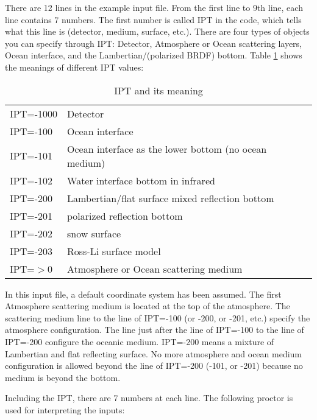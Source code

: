 \documentclass[10pt,letterpaper]{article}
\begin{document}
There are 12 lines in the example input file.  From the first line to 9th line, each line contains 7 numbers.  The first number is called IPT in the code, which tells what this line is (detector, medium, surface, etc.).  There are four types of objects you can specify through IPT:  Detector, Atmosphere or Ocean scattering layers, Ocean interface, and the Lambertian/(polarized BRDF) bottom.  Table \ref{tab:IPT} shows the meanings of different IPT values:

\begin{table}
\caption{IPT and its meaning}
\vspace{0.2 in}
\centering
\begin{tabular}{ll}
IPT=-1000 & Detector \\
IPT=-100   & Ocean interface\\
IPT=-101   & Ocean interface as the lower bottom (no ocean medium)\\
IPT=-102   & Water interface bottom in infrared \\
IPT=-200   & Lambertian/flat surface mixed reflection bottom   \\
IPT=-201   & polarized reflection bottom  \\
IPT=-202   & snow surface  \\
IPT=-203   & Ross-Li surface model  \\
IPT=$>$0  & Atmosphere or Ocean scattering medium
\end{tabular}
\label{tab:IPT}
\end{table}

In this input file, a default coordinate system has been assumed.  The first Atmosphere scattering medium is located at the top of the atmosphere.  
The scattering medium line to the line of IPT=-100 (or -200, or -201, etc.) specify the atmosphere configuration.  
The line just after the line of IPT=-100 to the line of IPT=-200 configure the oceanic medium.
IPT=-200 means a mixture of Lambertian and flat reflecting surface.  
No more atmosphere and ocean medium configuration is allowed beyond the line of IPT=-200 (-101, or -201) because no medium is beyond the bottom.

Including the IPT, there are 7 numbers at each line.  The following proctor is used for interpreting the inputs:
\end{document}
